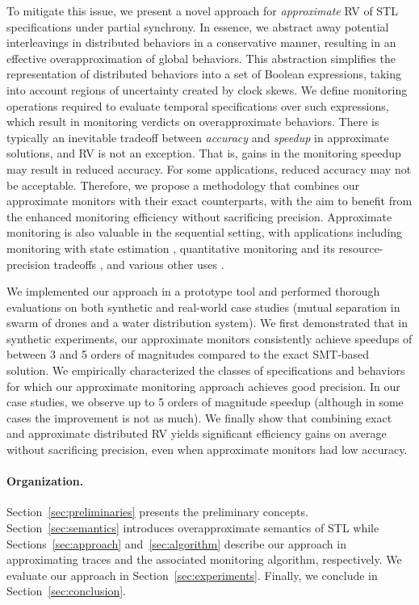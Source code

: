 To mitigate this issue, we present a novel approach for \emph{approximate} RV of STL 
specifications under partial synchrony.
%
In essence, we abstract away potential interleavings in distributed behaviors in a conservative 
manner, resulting in an effective overapproximation of global behaviors.
%
This abstraction simplifies the representation of distributed behaviors into a set of Boolean 
expressions, taking into account regions of uncertainty created by clock skews.
%
We define monitoring operations required to evaluate temporal specifications over such expressions, 
which result in monitoring verdicts on overapproximate behaviors.
%
There is typically an inevitable tradeoff between {\em accuracy} and {\em speedup} in approximate 
solutions, and  RV is not an exception.
%
That is, gains in the monitoring speedup may result in reduced accuracy.
%
For some applications, reduced accuracy may not be acceptable.
%
Therefore, we propose a methodology that combines our approximate monitors with their exact 
counterparts, with the aim to benefit from the enhanced monitoring efficiency without sacrificing 
precision.
%
Approximate monitoring is also valuable in the sequential setting, with applications including
monitoring with state estimation \cite{StollerBSGHSZ11,BartocciG13},
quantitative monitoring and its resource-precision tradeoffs \cite{HenzingerS21,HenzingerMS22,HenzingerMS23},
and various other uses \cite{AlechinaDL14,AcetoAFIL21}.



We implemented our approach in a prototype tool and performed thorough evaluations on both 
synthetic and real-world case studies (mutual separation in swarm of drones and a water distribution 
system).
%
We first demonstrated that in synthetic experiments, our approximate monitors consistently achieve 
speedups of between 3 and 5 orders of magnitudes compared to the exact SMT-based solution.
%
We empirically characterized the classes of specifications and behaviors for which our approximate 
monitoring approach achieves good precision.
%
In our case studies, we observe up to 5 orders of magnitude speedup (although in some cases the 
improvement is not as much).
%
We finally show that combining exact and approximate distributed RV yields significant efficiency gains on average without sacrificing precision, even when approximate monitors had low accuracy.

\paragraph{Organization.}
Section~\ref{sec:preliminaries} presents the preliminary concepts.
%
Section~\ref{sec:semantics} introduces overapproximate semantics of STL while 
Sections~\ref{sec:approach} and~\ref{sec:algorithm} describe our approach in approximating traces 
and the associated monitoring algorithm, respectively.
%
We evaluate our approach in Section~\ref{sec:experiments}. Finally, we conclude in 
Section~\ref{sec:conclusion}.
